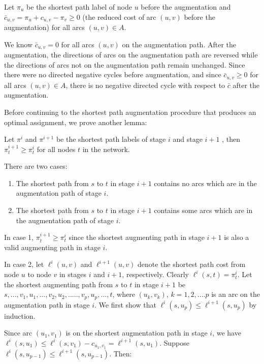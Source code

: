 Let $\pi_u$ be the shortest path label of node $u$ before the
augmentation and $\bar c_{u,v} = \pi_u +c_{u,v} - \pi_v\geq 0$ (the
reduced cost of arc $(u,v)$ before the augmentation) for all arcs
$(u,v)\in A$.

We know $\bar c_{u,v} = 0$ for all arcs $(u,v)$ on the augmentation
path. After the augmentation, the directions of arcs on the
augmentation path are reversed while the directions of arcs not on the
augmentation path remain unchanged. Since there were no directed
negative cycles before augmentation, and since $\bar c_{u,v}\geq 0 $
for all arcs $(u,v)\in A$, there is no negative directed cycle with
respect to $\bar c$ after the augmentation.  \bull

Before continuing to the shortest path augmentation procedure that
produces an optimal assignment, we prove another lemma:

 Let $\pi^i$ and $\pi^{i+1}$ be the shortest
path labels of stage $i$ and stage $i+1$ , then $\pi^{i+1}_t \geq
\pi^i_t$ for all nodes $t$ in the network.

\proof There are two cases:
\begin{enumerate}

\item The shortest path from $s$ to $t$ in stage $i+1$ contains no
arcs which are in the augmentation path of stage $i$.

\item The shortest path from $s$ to $t$ in stage $i+1$ contains some
arcs which are in the augmentation path of stage $i$.

\end{enumerate}

In case 1, $\pi^{i+1}_t \geq \pi^i_t$ since the shortest augmenting
path in stage $i+1$ is also a valid augmenting path in stage $i$.

In case 2, let $\ell^i(u,v)$ and $\ell^{i+1}(u,v)$ denote the shortest
path cost from node $u$ to node $v$ in stages $i$ and $i+1$,
respectively. Clearly $\ell^i(s,t) = \pi^i_t$.  Let the shortest
augmenting path from $s$ to $t$ in stage $i+1$ be
$s,...,v_1,u_1,...,v_2,u_2, ....., v_p,u_p,...,t$, where $(u_k,v_k)$,
$k =1,2, .... p$ is an arc on the augmentation path in stage $i$.  We
first show that $\ell^i(s,u_p)\leq \ell^{i+1}(s,u_p)$ by induction.

Since arc $(u_1,v_1)$ is on the shortest augmentation path in stage
$i$, we have $\ell^i(s,u_1)\leq \ell^i(s,v_1) - c_{u_1,v_1} =
\ell^{i+1}(s,u_1)$.  Suppose $\ell^i(s,u_{p-1})\leq
\ell^{i+1}(s,u_{p-1})$. Then:

